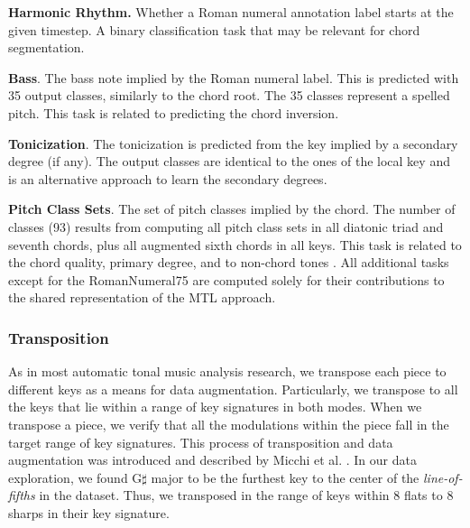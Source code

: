 \textbf{Harmonic Rhythm.} Whether a Roman numeral annotation label starts at the given timestep. A binary classification task that may be relevant for chord segmentation.

\textbf{Bass}. The bass note implied by the Roman numeral label. This is predicted with 35 output classes, similarly to the chord root. The 35 classes represent a spelled pitch. This task is related to predicting the chord inversion.

\textbf{Tonicization}. The tonicization is predicted from the key implied by a secondary degree (if any). 
The output classes are identical to the ones of the local key and is an alternative approach to learn the secondary degrees.

\textbf{Pitch Class Sets}. The set of pitch classes implied by the chord. The number of classes (93) results from computing all pitch class sets in all diatonic triad and seventh chords, plus all augmented sixth chords in all keys. This task is related to the chord quality, primary degree, and to non-chord tones \cite{ju_non-chord_2017}.
All additional tasks except for the RomanNumeral75 are computed solely for their contributions to the shared representation of the MTL approach.


\subsubsection{Transposition}

As in most automatic tonal music analysis research, we transpose each piece to different keys as a means for data augmentation. 
Particularly, we transpose to all the keys that lie within a range of key signatures in both modes.
When we transpose a piece, we verify that all the modulations within the piece fall in the target range of key signatures.
This process of transposition and data augmentation was introduced and described by Micchi et al. \cite{micchi_not_2020}.
In our data exploration, we found G$\sharp$ major to be the furthest key to the center of the \emph{line-of-fifths} \cite{temperley_line_2000} in the dataset. 
Thus, we transposed in the range of keys within 8 flats to 8 sharps in their key signature.


